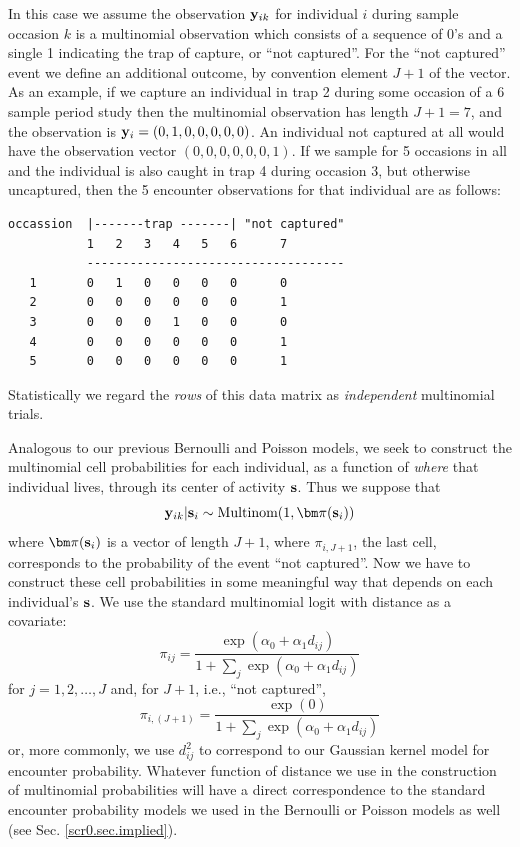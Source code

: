 In this case we assume the observation ${\bf y}_{ik}$ for individual
$i$ during sample occasion $k$ is a multinomial observation which
consists of a sequence of 0's and  a single 1 indicating the
trap of capture, or ``not captured''. For the ``not captured'' event
we define an additional outcome, by convention element $J+1$ of the
vector.  As an example, if we capture an individual in trap 2 during
some occasion of a
6 sample period study then the multinomial observation has length $J+1
= 7$, and the observation is ${\bf y}_{i} = (0,1,0,0,0,0,0)$. An
individual not captured at all would have the observation vector
$(0,0,0,0,0,0,1)$.  If we sample for 5 occasions
in all and the
individual is also caught in trap 4 during occasion 3, but otherwise
uncaptured, then the 5 encounter observations for that individual are
as follows:
\begin{verbatim}
occassion  |-------trap -------| "not captured"
           1   2   3   4   5   6      7
           ------------------------------------
   1       0   1   0   0   0   0      0
   2       0   0   0   0   0   0      1
   3       0   0   0   1   0   0      0
   4       0   0   0   0   0   0      1
   5       0   0   0   0   0   0      1
\end{verbatim}
Statistically we regard the {\it rows} of this data matrix as {\it
  independent} multinomial trials.

Analogous to our previous Bernoulli and Poisson models, we seek to
construct the multinomial cell probabilities for each individual, as a
function of {\it where} that individual lives, through its center of
activity ${\bf s}$. Thus we suppose that
\begin{equation}
 {\bf y}_{ik}|{\bf s}_{i} \sim \mbox{Multinom}(1, {\bm \pi}({\bf s}_{i}) )
\label{poisson-mn.eq.mn}
\end{equation}
where ${\bm \pi}({\bf s}_{i})$ is a vector of length $J+1$, where
$\pi_{i,J+1}$, the last cell, corresponds to the probability of the
event ``not captured''.  Now we have to construct these cell
probabilities in some meaningful way that depends on each individual's
${\bf s}$.  We use the standard multinomial logit with distance as a
covariate:
\[
 \pi_{ij} = \frac{  \exp(\alpha_{0} + \alpha_{1} d_{ij}) }{ 1+ \sum_{j}
   \exp(\alpha_{0} + \alpha_{1} d_{ij})}
\]
for $j=1,2,\ldots,J$ and, for $J+1$, i.e., ``not captured'',
\[
 \pi_{i,(J+1)} = \frac{  \exp(0) }
                    { 1+ \sum_{j} \exp(\alpha_{0} + \alpha_{1} d_{ij})}
\]
or, more commonly, we use $d_{ij}^{2}$ to correspond to our Gaussian
kernel model for encounter probability. Whatever function of distance
we use in the construction of multinomial probabilities will have a
direct correspondence to the standard encounter probability models we
used in the Bernoulli or Poisson models as well (see
Sec. \ref{scr0.sec.implied}).

